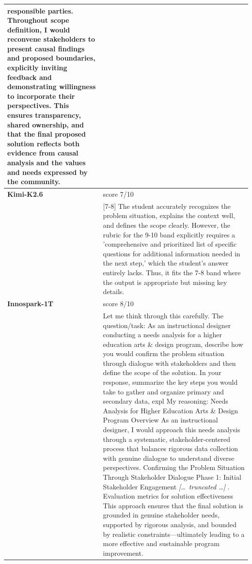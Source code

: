 \begin{longtable}{@{}l p{12.5cm}@{}}
responsible parties. Throughout scope definition, I would reconvene stakeholders to present causal findings and proposed boundaries, explicitly inviting feedback and demonstrating willingness to incorporate their perspectives. This ensures transparency, shared ownership, and that the final proposed solution reflects both evidence from causal analysis and the values and needs expressed by the community. \\
  \midrule
  \textbf{Kimi-K2.6} & score 7/10 \\
  & [7-8] The student accurately recognizes the problem situation, explains the context well, and defines the scope clearly. However, the rubric for the 9-10 band explicitly requires a 'comprehensive and prioritized list of specific questions for additional information needed in the next step,' which the student's answer entirely lacks. Thus, it fits the 7-8 band where the output is appropriate but missing key details. \\
  \textbf{Innospark-1T} & score 8/10 \\
  & Let me think through this carefully. \newline The question/task: As an instructional designer conducting a needs analysis for a higher education arts \& design program, describe how you would confirm the problem situation through dialogue with stakeholders and then define the scope of the solution. In your response, summarize the key steps you would take to gather and organize primary and secondary data, expl \newline My reasoning: Needs Analysis for Higher Education Arts \& Design Program \newline Overview \newline As an instructional designer, I would approach this needs analysis through a systematic, stakeholder-centered process that balances rigorous data collection with genuine dialogue to understand diverse perspectives. Confirming the Problem Situation Through Stakeholder Dialogue \newline Phase 1: Initial Stakeholder Engagement \newline \textit{[\ldots\ truncated \ldots]} \newline 8. Evaluation metrics for solution effectiveness \newline This approach ensures that the final solution is grounded in genuine stakeholder needs, supported by rigorous analysis, and bounded by realistic constraints---ultimately leading to a more effective and sustainable program improvement. \\

\end{longtable}
